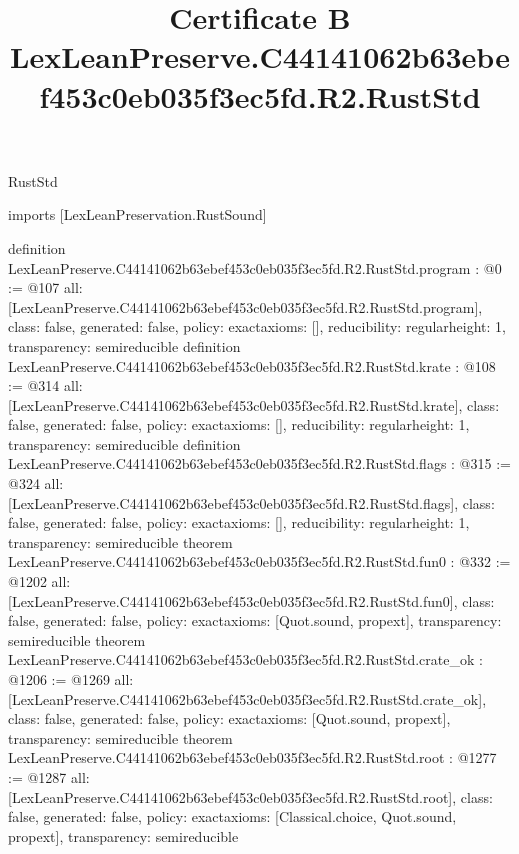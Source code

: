 \begin{lexlean}{RustStd}
\title{Certificate B LexLeanPreserve.C44141062b63ebef453c0eb035f3ec5fd.R2.RustStd}
\begin{coremodule}
imports [LexLeanPreservation.RustSound]

definition LexLeanPreserve.C44141062b63ebef453c0eb035f3ec5fd.R2.RustStd.program : @0 := @107 {
  all: [LexLeanPreserve.C44141062b63ebef453c0eb035f3ec5fd.R2.RustStd.program],
  class: false,
  generated: false,
  policy: exact{axioms: []},
  reducibility: regular{height: 1},
  transparency: semireducible
}
definition LexLeanPreserve.C44141062b63ebef453c0eb035f3ec5fd.R2.RustStd.krate : @108 := @314 {
  all: [LexLeanPreserve.C44141062b63ebef453c0eb035f3ec5fd.R2.RustStd.krate],
  class: false,
  generated: false,
  policy: exact{axioms: []},
  reducibility: regular{height: 1},
  transparency: semireducible
}
definition LexLeanPreserve.C44141062b63ebef453c0eb035f3ec5fd.R2.RustStd.flags : @315 := @324 {
  all: [LexLeanPreserve.C44141062b63ebef453c0eb035f3ec5fd.R2.RustStd.flags],
  class: false,
  generated: false,
  policy: exact{axioms: []},
  reducibility: regular{height: 1},
  transparency: semireducible
}
theorem LexLeanPreserve.C44141062b63ebef453c0eb035f3ec5fd.R2.RustStd.fun0 : @332 := @1202 {
  all: [LexLeanPreserve.C44141062b63ebef453c0eb035f3ec5fd.R2.RustStd.fun0],
  class: false,
  generated: false,
  policy: exact{axioms: [Quot.sound, propext]},
  transparency: semireducible
}
theorem LexLeanPreserve.C44141062b63ebef453c0eb035f3ec5fd.R2.RustStd.crate_ok : @1206 := @1269 {
  all: [LexLeanPreserve.C44141062b63ebef453c0eb035f3ec5fd.R2.RustStd.crate_ok],
  class: false,
  generated: false,
  policy: exact{axioms: [Quot.sound, propext]},
  transparency: semireducible
}
theorem LexLeanPreserve.C44141062b63ebef453c0eb035f3ec5fd.R2.RustStd.root : @1277 := @1287 {
  all: [LexLeanPreserve.C44141062b63ebef453c0eb035f3ec5fd.R2.RustStd.root],
  class: false,
  generated: false,
  policy: exact{axioms: [Classical.choice, Quot.sound, propext]},
  transparency: semireducible
}


\end{coremodule}
\end{lexlean}
